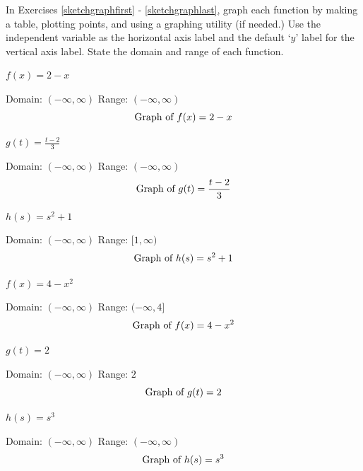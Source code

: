 \documentclass{ximera}
\begin{document}
\begin{question}
In Exercises \ref{sketchgraphfirst} - \ref{sketchgraphlast}, graph each function by making a table, plotting points, and using a graphing utility (if needed.)  Use the independent variable as the horizontal axis label and the default `$y$' label for the vertical axis label.  State the domain and range of each function. 

\begin{problem}\label{sketchgraphfirst}
$f(x) = 2-x$

\begin{solution}
Domain: $(-\infty, \infty)$ 
Range:  $(-\infty, \infty)$
$$\text{Graph of $f(x) = 2-x$}$$
\end{solution}
\end{problem}

\begin{problem}
$g(t) = \frac{t - 2}{3}$

\begin{solution}
Domain: $(-\infty, \infty)$ 
Range:  $(-\infty, \infty)$
$$\text{Graph of $g(t) = \frac{t - 2}{3}$}$$
\end{solution}
\end{problem}

\begin{problem}
$h(s)=s^2+1$

\begin{solution}
Domain: $(-\infty, \infty)$ 
Range:  $[1, \infty)$
$$\text{Graph of $h(s)=s^2+1$}$$
\end{solution}
\end{problem}

\begin{problem}
$f(x) = 4-x^2$

\begin{solution}
Domain: $(-\infty, \infty)$ 
Range:  $(-\infty, 4]$
$$\text{Graph of $f(x) = 4-x^2$}$$
\end{solution}
\end{problem}

\begin{problem}
$g(t) = 2$

\begin{solution}
Domain: $(-\infty, \infty)$ 
Range:  ${2}$
$$\text{Graph of $g(t) = 2$}$$
\end{solution}
\end{problem}

\begin{problem}
$h(s) = s^3$

\begin{solution}
Domain: $(-\infty, \infty)$ 
Range:  $(-\infty, \infty)$ 
$$\text{Graph of $h(s) = s^3$}$$
\end{solution}
\end{problem}


\end{question}
\end{document}
